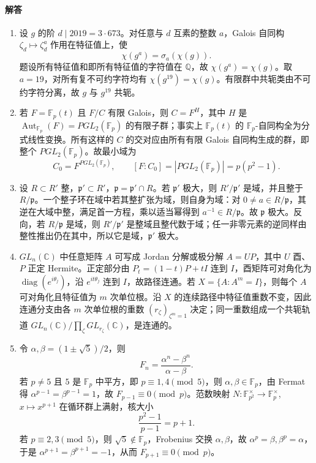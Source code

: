 \documentclass[UTF8,12pt]{ctexart}
\begin{document}
\paragraph{解答}
\begin{enumerate}[label=\textbf{\arabic*.},leftmargin=2.2em]
\item 设 \(g\) 的阶 \(d\mid2019=3\cdot673\)。对任意与 \(d\) 互素的整数 \(a\)，Galois 自同构 \(\zeta_d\mapsto\zeta_d^a\) 作用在特征值上，使
\[
\chi(g^a)=\sigma_a(\chi(g)).
\]
题设所有特征值和即所有特征值的字符值在 \(\mathbb Q\)，故 \(\chi(g^a)=\chi(g)\)。取 \(a=19\)，对所有复不可约字符均有 \(\chi(g^{19})=\chi(g)\)。有限群中共轭类由不可约字符分离，故 \(g\) 与 \(g^{19}\) 共轭。
\item 若 \(F=\mathbb F_p(t)\) 且 \(F/C\) 有限 Galois，则 \(C=F^H\)，其中 \(H\) 是 \(\operatorname{Aut}_{\mathbb F_p}(F)=PGL_2(\mathbb F_p)\) 的有限子群；事实上 \(\mathbb F_p(t)\) 的 \(\mathbb F_p\)-自同构全为分式线性变换。所有这样的 \(C\) 的交对应由所有有限 Galois 自同构生成的群，即整个 \(PGL_2(\mathbb F_p)\)。故最小域为
\[
C_0=F^{PGL_2(\mathbb F_p)},\qquad [F:C_0]=|PGL_2(\mathbb F_p)|=p(p^2-1).
\]
\item 设 \(R\subset R'\) 整，\(\mathfrak p'\subset R'\)，\(\mathfrak p=\mathfrak p'\cap R\)。若 \(\mathfrak p'\) 极大，则 \(R'/\mathfrak p'\) 是域，并且整于 \(R/\mathfrak p\)。一个整子环在域中若其整扩张为域，则自身为域：对 \(0\ne a\in R/\mathfrak p\)，其逆在大域中整，满足首一方程，乘以适当幂得到 \(a^{-1}\in R/\mathfrak p\)。故 \(\mathfrak p\) 极大。反向，若 \(R/\mathfrak p\) 是域，则 \(R'/\mathfrak p'\) 是整域且整代数于域；任一非零元素的逆同样由整性推出仍在其中，所以它是域，\(\mathfrak p'\) 极大。
\item \(GL_n(\mathbb C)\) 中任意矩阵 \(A\) 可写成 Jordan 分解或极分解 \(A=UP\)，其中 \(U\) 酉、\(P\) 正定 Hermite。正定部分由 \(P_t=(1-t)P+tI\) 连到 \(I\)，酉矩阵可对角化为 \(\operatorname{diag}(e^{i\theta_j})\)，沿 \(e^{it\theta_j}\) 连到 \(I\)，故路径连通。若 \(X=\{A:A^m=I\}\)，则每个 \(A\) 可对角化且特征值为 \(m\) 次单位根。沿 \(X\) 的连续路径中特征值重数不变，因此连通分支由各 \(m\) 次单位根的重数
\((r_\zeta)_{\zeta^m=1}\) 决定；同一重数组成一个共轭轨道 \(GL_n(\mathbb C)/\prod_\zeta GL_{r_\zeta}(\mathbb C)\)，是连通的。
\item 令 \(\alpha,\beta=(1\pm\sqrt5)/2\)，则
\[
F_n=\frac{\alpha^n-\beta^n}{\alpha-\beta}.
\]
若 \(p\ne5\) 且 \(5\) 是 \(\mathbb F_p\) 中平方，即 \(p\equiv1,4\pmod5\)，则 \(\alpha,\beta\in\mathbb F_p\)，由 Fermat 得 \(\alpha^{p-1}=\beta^{p-1}=1\)，故 \(F_{p-1}\equiv0\pmod p\)。范数映射 \(N:\mathbb F_{p^2}^\times\to\mathbb F_p^\times\), \(x\mapsto x^{p+1}\) 在循环群上满射，核大小
\[
\frac{p^2-1}{p-1}=p+1.
\]
若 \(p\equiv2,3\pmod5\)，则 \(\sqrt5\notin\mathbb F_p\)，Frobenius 交换 \(\alpha,\beta\)，故 \(\alpha^p=\beta,\beta^p=\alpha\)，于是 \(\alpha^{p+1}=\beta^{p+1}=-1\)，从而 \(F_{p+1}\equiv0\pmod p\)。
\end{enumerate}
\end{document}
